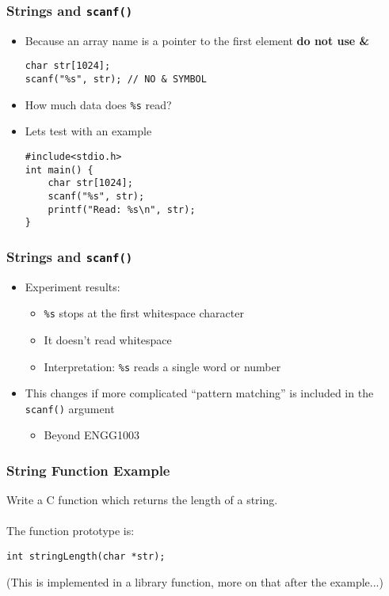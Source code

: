 \documentclass[14pt]{beamer}
\begin{document}
\begin{frame}[fragile]
\frametitle{Strings and \texttt{scanf()}}
\begin{itemize}
\item Because an array name is a pointer to the first element \textbf{do not use \&}
\begin{lstlisting}[style=CStyle]
char str[1024];
scanf("%s", str); // NO & SYMBOL
\end{lstlisting}
\pause
\item How much data does \texttt{\%s} read?
\pause
\item Lets test with an example
\begin{lstlisting}[style=CStyle]
#include<stdio.h> 
int main() { 
    char str[1024]; 
    scanf("%s", str); 
    printf("Read: %s\n", str); 
}
\end{lstlisting}
\end{itemize}
\end{frame}

\begin{frame}
\frametitle{Strings and \texttt{scanf()}}
\begin{itemize}
\item Experiment results:
	\begin{itemize}
		\item \texttt{\%s} stops at the first whitespace character
		\item It doesn't read  whitespace
		\item Interpretation: \texttt{\%s} reads a single word or number
	\end{itemize}
\item This changes if more complicated ``pattern matching'' is included in the \texttt{scanf()} argument
	\begin{itemize}
		\item Beyond ENGG1003
	\end{itemize}
\end{itemize}
\end{frame}

\begin{frame}[fragile]
\frametitle{String Function Example}
Write a C function which returns the length of a string.
\\~\\
The function prototype is:

\begin{lstlisting}[style=CStyle]
int stringLength(char *str);
\end{lstlisting}
(This is implemented in a library function, more on that after the example...)
\end{frame}
\end{document}
